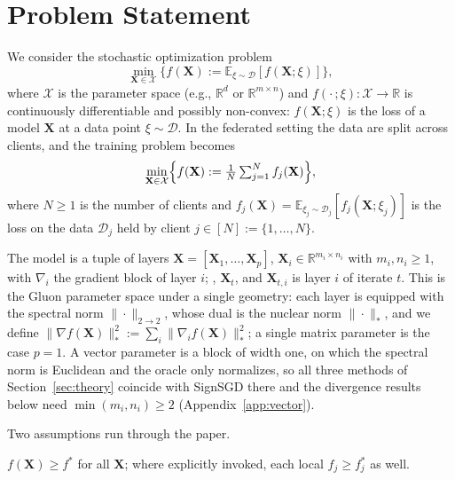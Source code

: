 \section{Problem Statement}\label{sec:proState}

We consider the stochastic optimization problem
\begin{equation}
\min_{\mathbf{X} \in \mathcal{X}} \{f(\mathbf{X}) := \mathbb{E}_{\xi \sim \mathcal{D}} [f(\mathbf{X};\xi)]\},
\end{equation}
where $\mathcal{X}$ is the parameter space (e.g., $\mathbb{R}^d$ or $\mathbb{R}^{m \times n}$) and $f(\cdot\,;\xi) : \mathcal{X} \to \mathbb{R}$ is continuously differentiable and possibly non-convex: $f(\mathbf{X};\xi)$ is the loss of a model $\mathbf{X}$ at a data point $\xi \sim \mathcal{D}$. In the federated setting the data are split across clients, and the training problem becomes
\begin{equation}
\min_{\mathbf{X} \in \mathcal{X}} \Bigl\{ f(\mathbf{X}) := \tfrac{1}{N}\textstyle\sum_{j=1}^N f_j(\mathbf{X})\Bigr\},
\label{fed_eq}
\end{equation}
where $N \ge 1$ is the number of clients and $f_j(\mathbf{X})=\mathbb{E}_{\xi_j\sim\mathcal{D}_j}[f_j(\mathbf{X};\xi_j)]$ is the loss on the data $\mathcal{D}_j$ held by client $j \in [N] := \{1, \dots, N\}$.

The model is a tuple of layers $\mathbf{X} = [\mathbf{X}_1,\dots,\mathbf{X}_p]$, $\mathbf{X}_i \in \mathbb{R}^{m_i\times n_i}$ with $m_i,n_i\ge1$, with $\nabla_i$ the gradient block of layer $i$; , $\mathbf{X}_t$, and $\mathbf{X}_{t,i}$ is layer $i$ of iterate $t$. This is the Gluon parameter space \citep{riabinin2025gluon} under a single geometry: each layer is equipped with the spectral norm $\|\cdot\|_{2\to2}$, whose dual is the nuclear norm $\|\cdot\|_{*}$, and we define $\|\nabla f(\mathbf{X})\|_*^2 := \sum_i\|\nabla_i f(\mathbf{X})\|_*^2$; a single matrix parameter is the case $p=1$. A vector parameter is a block of width one, on which the spectral norm is Euclidean and the oracle only normalizes, so all three methods of Section~\ref{sec:theory} coincide with SignSGD there and the divergence results below need $\min(m_i,n_i)\ge2$ (Appendix~\ref{app:vector}).

Two assumptions run through the paper.

\begin{assumption}\label{as:1}
$f(\mathbf{X}) \ge f^*$ for all $\mathbf{X}$; where explicitly invoked, each local $f_j \ge f_j^*$ as well.
\end{assumption}

